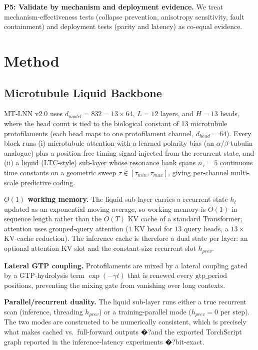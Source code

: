\documentclass[10pt,twocolumn]{article}
\begin{document}
\textbf{P5: Validate by mechanism and deployment evidence.} We treat mechanism-effectiveness tests (collapse prevention, anisotropy sensitivity, fault containment) and deployment tests (parity and latency) as co-equal evidence.

\section{Method}
\subsection{Microtubule Liquid Backbone}
MT-LNN v2.0 uses $d_{model}=832=13\times64$, $L=12$ layers, and $H=13$ heads, where the head count is tied to the biological constant of 13 microtubule protofilaments (each head maps to one protofilament channel, $d_{head}=64$). Every block runs (i) microtubule attention with a learned polarity bias (an $\alpha/\beta$-tubulin analogue) plus a position-free timing signal injected from the recurrent state, and (ii) a liquid (LTC-style) sub-layer whose resonance bank spans $n_\tau=5$ continuous time constants on a geometric sweep $\tau\in[\tau_{min},\tau_{max}]$, giving per-channel multi-scale predictive coding.

\textbf{$O(1)$ working memory.} The liquid sub-layer carries a recurrent state $h_t$ updated as an exponential moving average, so working memory is $O(1)$ in sequence length rather than the $O(T)$ KV cache of a standard Transformer; attention uses grouped-query attention ($1$ KV head for $13$ query heads, a $13\times$ KV-cache reduction). The inference cache is therefore a dual state per layer: an optional attention KV slot and the constant-size recurrent slot $h_{prev}$.

\textbf{Lateral GTP coupling.} Protofilaments are mixed by a lateral coupling gated by a GTP-hydrolysis term $\exp(-\gamma t)$ that is renewed every $\mathrm{gtp\_period}$ positions, preventing the mixing gate from vanishing over long contexts.

\textbf{Parallel/recurrent duality.} The liquid sub-layer runs either a true recurrent scan (inference, threading $h_{prev}$) or a training-parallel mode ($h_{prev}=0$ per step). The two modes are constructed to be numerically consistent, which is precisely what makes cached vs.\ full-forward outputs �?and the exported TorchScript graph reported in the inference-latency experiments �?bit-exact.
\end{document}
